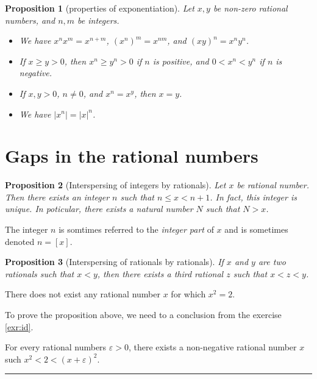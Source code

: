\documentclass[
]{book}
\providecommand{\tightlist}{%
  \setlength{\itemsep}{0pt}\setlength{\parskip}{0pt}}
\newtheorem{proposition}{Proposition}[chapter]
\theoremstyle{definition}
\theoremstyle{definition}
\theoremstyle{definition}
\theoremstyle{definition}
\theoremstyle{remark}
\begin{document}
\begin{proposition}[properties of exponentiation]

Let \(x,y\) be non-zero rational numbers, and \(n,m\) be integers.

\begin{itemize}
\tightlist
\item
  We have \(x^nx^m = x^{n+m}\), \((x^n)^m = x^{nm}\), and \((xy)^n=x^ny^n\).
\item
  If \(x\geq y>0\), then \(x^n\geq y^n>0\) if \(n\) is positive, and \(0<x^n<y^n\) if \(n\) is negative.
\item
  If \(x,y > 0\), \(n\ne 0\), and \(x^n=x^y\), then \(x=y\).
\item
  We have \(|x^n| = |x|^n\).
\end{itemize}

\end{proposition}

\section{Gaps in the rational numbers}\label{gaps-in-the-rational-numbers}

\begin{proposition}[Interspersing of integers by rationals]
Let \(x\) be rational number. Then there exists an integer \(n\) such that \(n\leq x<n+1\). In fact, this integer is unique. In poticular, there exists a natural number \(N\) such that \(N>x\).
\end{proposition}

The integer \(n\) is somtimes referred to the \emph{integer part} of \(x\) and is sometimes denoted \(n=[x]\).

\begin{proposition}[Interspersing of rationals by rationals]
If \(x\) and \(y\) are two rationals such that \(x<y\), then there exists a third rational \(z\) such that \(x<z<y\).
\end{proposition}

There does not exist any rational number \(x\) for which \(x^2=2\).

To prove the proposition above, we need to a conclusion from the exercise \ref{exr:id}.

For every rational numbers \(\varepsilon>0\), there exists a non-negative rational number \(x\) such \(x^2<2<(x+\varepsilon)^2\).

\begin{center}\rule{0.5\linewidth}{0.5pt}\end{center}
\end{document}
